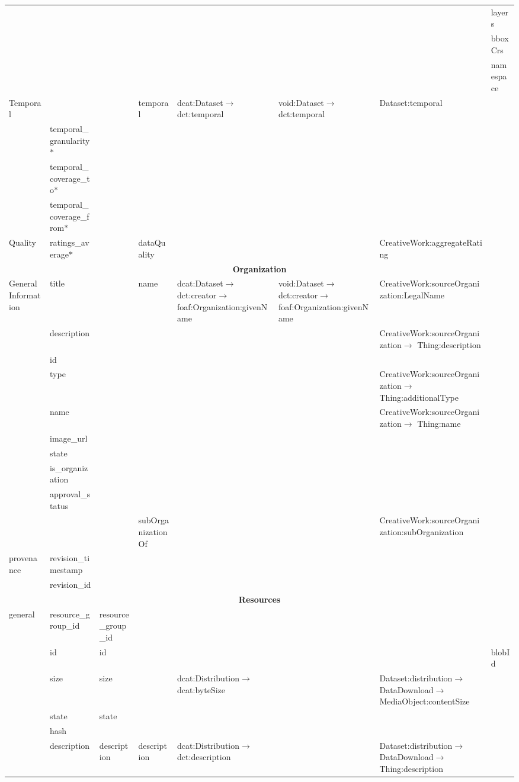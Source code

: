 \begin{landscape}
{\begin{longtable}{|p{1cm}|m{3.1cm}|m{2.4cm}|m{2.5cm}|p{3.8cm}|m{3.8cm}|m{5.55cm}|m{2.5cm}|}
\cline{2-8}
 &  &  &  &  &  &  & layers\tabularnewline
\cline{2-8}
 &  &  &  &  &  &  & bboxCrs\tabularnewline
\cline{2-8}
 &  &  &  &  &  &  & namespace\tabularnewline
\hline
\multirow{4}{2cm}{Temporal} &  &  & temporal & dcat:Dataset$\rightarrow$ dct:temporal & void:Dataset$\rightarrow$ dct:temporal & Dataset:temporal & \tabularnewline
\cline{2-8}
 & temporal\_granularity$\ast$ &  &  &  &  &  & \tabularnewline
\cline{2-8}
 & temporal\_coverage\_to$\ast$ &  &  &  &  &  & \tabularnewline
\cline{2-8}
 & temporal\_coverage\_from$\ast$ &  &  &  &  &  & \tabularnewline
\hline
Quality & ratings\_average$\ast$ &  & dataQuality &  &  & CreativeWork:aggregateRating & \tabularnewline
\hline
\multicolumn{8}{|c|}{\cellcolor{blue!25}\textbf{Organization}}\tabularnewline
\hline
\multirow{10}{2cm}{General Information} & title &  & name & dcat:Dataset$\rightarrow$ dct:creator$\rightarrow$ foaf:Organization:givenName & void:Dataset$\rightarrow$ dct:creator$\rightarrow$ foaf:Organization:givenName & CreativeWork:sourceOrganization:LegalName & \tabularnewline
\cline{2-8}
 & description &  &  &  &  & CreativeWork:sourceOrganization$\rightarrow$ Thing:description & \tabularnewline
\cline{2-8}
 & id &  &  &  &  &  & \tabularnewline
\cline{2-8}
 & type &  &  &  &  & CreativeWork:sourceOrganization$\rightarrow$ Thing:additionalType & \tabularnewline
\cline{2-8}
 & name &  &  &  &  & CreativeWork:sourceOrganization$\rightarrow$ Thing:name & \tabularnewline
\cline{2-8}
 & image\_url &  &  &  &  &  & \tabularnewline
\cline{2-8}
 & state &  &  &  &  &  & \tabularnewline
\cline{2-8}
 & is\_organization &  &  &  &  &  & \tabularnewline
\cline{2-8}
 & approval\_status &  &  &  &  &  & \tabularnewline
\cline{2-8}
 &  &  & subOrganizationOf &  &  & CreativeWork:sourceOrganization:subOrganization & \tabularnewline
\multirow{2}{2cm}{provenance} & revision\_timestamp &  &  &  &  &  & \tabularnewline
\cline{2-8}
 & revision\_id &  &  &  &  &  & \tabularnewline
\hline
\multicolumn{8}{|c|}{\cellcolor{blue!25}\textbf{Resources}}\tabularnewline
\hline
\multirow{15}{2cm}{general} & resource\_group\_id & resource\_group\_id &  &  &  &  & \tabularnewline
\cline{2-8}
 & id & id &  &  &  &  & blobId\tabularnewline
\cline{2-8}
 & size & size &  & dcat:Distribution$\rightarrow$ dcat:byteSize &  & Dataset:distribution$\rightarrow$ DataDownload$\rightarrow$ MediaObject:contentSize & \tabularnewline
\cline{2-8}
 & state & state &  &  &  &  & \tabularnewline
\cline{2-8}
 & hash &  &  &  &  &  & \tabularnewline
\cline{2-8}
 & description & description & description & dcat:Distribution$\rightarrow$ dct:description &  & Dataset:distribution$\rightarrow$ DataDownload$\rightarrow$ Thing:description & \tabularnewline

\end{longtable}}
\end{landscape}
